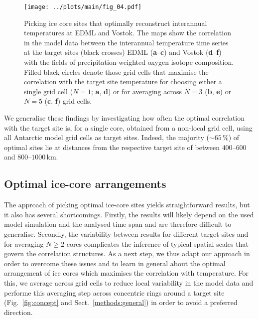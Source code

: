\documentclass[cp, manuscript]{copernicus}
\begin{document}
\begin{figure*}[t]%
\centering
\texttt{[image: ../plots/main/fig\_04.pdf]}
\caption[Picking optimal sites]{%
  Picking ice core sites that optimally reconstruct interannual temperatures at
  EDML and Vostok. The maps show the correlation in the model data between the
  interannual temperature time series at the target sites (black crosses) EDML
  (\textbf{a}--\textbf{c}) and Vostok (\textbf{d}--\textbf{f}) with the fields
  of precipitation-weighted oxygen isotope composition. Filled black circles
  denote those grid cells that maximise the correlation with the target site
  temperature for choosing either a single grid cell ($N=1$; \textbf{a},
  \textbf{d}) or for averaging across $N=3$ (\textbf{b}, \textbf{e}) or $N=5$
  (\textbf{c}, \textbf{f}) grid cells.}
\label{fig:picking}%
\end{figure*}%

We generalise these findings by investigating how often the optimal correlation
with the target site is, for a single core, obtained from a non-local grid cell,
using all Antarctic model grid cells as target sites. Indeed, the majority
($\sim65$\,\%) of optimal sites lie at distances from the respective target site
of between $400$--$600$ and $800$--$1000$\,km.


\subsection{Optimal ice-core arrangements}
\label{results:optim-spacing}

The approach of picking optimal ice-core sites yields straightforward results,
but it also has several shortcomings. Firstly, the results will likely depend on
the used model simulation and the analysed time span and are therefore difficult
to generalise. Secondly, the variability between results for different target
sites and for averaging $N\ge2$ cores complicates the inference of typical
spatial scales that govern the correlation structures. As a next step, we thus
adapt our approach in order to overcome these issues and to learn in general
about the optimal arrangement of ice cores which maximises the correlation with
temperature. For this, we average across grid cells to reduce local variability
in the model data and performe this averaging step across concentric rings
around a target site (Fig.~\ref{fig:concept} and Sect.~\ref{methods:general}) in
order to avoid a preferred direction.
\end{document}
